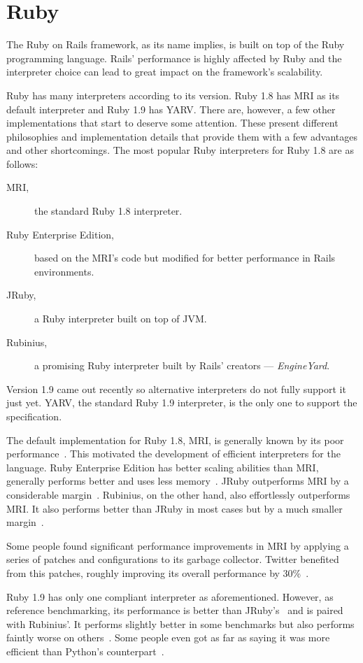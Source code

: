 \section{Ruby} %
\label{state:sec:ruby}
The Ruby on Rails framework, as its name implies, is built on top of the Ruby programming language. Rails' performance is highly affected by Ruby and the interpreter choice can lead to great impact on the framework's scalability.

Ruby has many interpreters according to its version. Ruby 1.8 has MRI as its default interpreter and Ruby 1.9 has YARV. There are, however, a few other implementations that start to deserve some attention. These present different philosophies and implementation details that provide them with a few advantages and other shortcomings. The most popular Ruby interpreters for Ruby 1.8 are as follows:
\begin{description}
\item[MRI,] the standard Ruby 1.8 interpreter.
\item[Ruby Enterprise Edition,] based on the MRI's code but modified for better performance in Rails environments.
\item[JRuby,] a Ruby interpreter built on top of JVM.
\item[Rubinius,] a promising Ruby interpreter built by Rails' creators --- \textit{EngineYard}.
\end{description}
Version 1.9 came out recently so alternative interpreters do not fully support it just yet. YARV, the standard Ruby 1.9 interpreter, is the only one to support the specification.

The default implementation for Ruby 1.8, MRI, is generally known by its poor performance~\cite{6tips_for_mri}. This motivated the development of efficient interpreters for the language. Ruby Enterprise Edition has better scaling abilities than MRI, generally performs better and uses less memory~\cite{ree_benchmarks}. JRuby outperforms MRI by a considerable margin~\cite{ruby19_performance}. Rubinius, on the other hand, also effortlessly outperforms MRI. It also performs better than JRuby in most cases but by a much smaller margin~\cite{rvm_rubinius_benchmarks}.

Some people found significant performance improvements in MRI by applying a series of patches and configurations to its garbage collector. Twitter benefited from this patches, roughly improving its overall performance by 30\%~\cite{ruby_gc_tuning}.

Ruby 1.9 has only one compliant interpreter as aforementioned. However, as reference benchmarking, its performance is better than JRuby's~\cite{ruby19_performance}  and is paired with Rubinius'. It performs slightly better in some benchmarks but also performs faintly worse on others~\cite{rvm_rubinius_benchmarks,ruby_interpreter_benchmarks}. Some people even got as far as saying it was more efficient than Python's counterpart~\cite{ruby19_python}.

